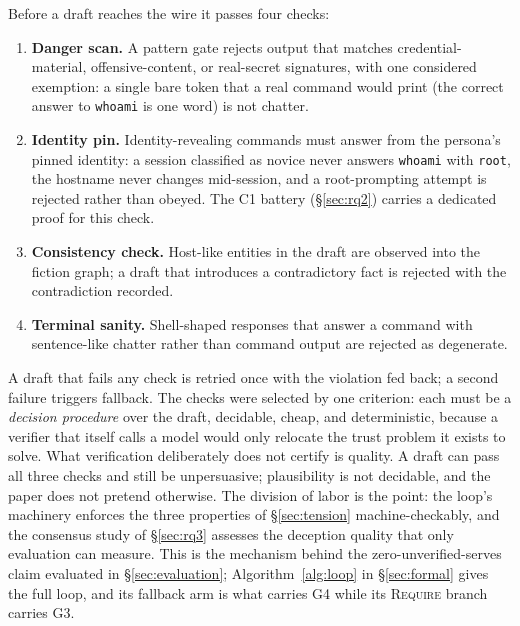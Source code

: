 Before a draft reaches the wire it passes four checks:
\begin{enumerate}
\item \textbf{Danger scan.} A pattern gate rejects output that matches
credential-material, offensive-content, or real-secret signatures, with
one considered exemption: a single bare token that a real command would
print (the correct answer to \texttt{whoami} is one word) is not chatter.
\item \textbf{Identity pin.} Identity-revealing commands must answer from
the persona's pinned identity: a session classified as novice never
answers \texttt{whoami} with \texttt{root}, the hostname never changes
mid-session, and a root-prompting attempt is rejected rather than
obeyed. The C1 battery (\S\ref{sec:rq2}) carries a dedicated proof for
this check.
\item \textbf{Consistency check.} Host-like entities in the draft are
observed into the fiction graph; a draft that introduces a contradictory
fact is rejected with the contradiction recorded.
\item \textbf{Terminal sanity.} Shell-shaped responses that answer a
command with sentence-like chatter rather than command output are
rejected as degenerate.
\end{enumerate}
A draft that fails any check is retried once with the violation fed back;
a second failure triggers fallback. The checks were selected by one
criterion: each must be a \emph{decision procedure} over the draft,
decidable, cheap, and deterministic, because a verifier that itself calls
a model would only relocate the trust problem it exists to solve. What
verification deliberately does not certify is quality. A draft can pass
all three checks and still be unpersuasive; plausibility is not
decidable, and the paper does not pretend otherwise. The division of
labor is the point: the loop's machinery enforces the three properties
of \S\ref{sec:tension} machine-checkably, and the consensus study of
\S\ref{sec:rq3} assesses the deception quality that only evaluation can
measure. This is the mechanism behind the zero-unverified-serves claim
evaluated in \S\ref{sec:evaluation};
Algorithm~\ref{alg:loop} in \S\ref{sec:formal} gives the
full loop, and its fallback arm is what carries G4 while its
\textsc{Require} branch carries G3.

